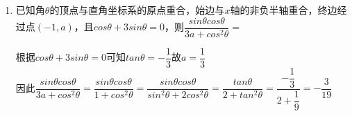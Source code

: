 \begin{enumerate}
         $ sin\alpha\cdot\sec\alpha>0$. 
        其中正确的是.
        \item 已知角$\theta$的顶点与直角坐标系的原点重合，始边与$x$轴的非负半轴重合，终边经过点$(-1, a)$，且$cos\theta + 3 sin\theta = 0$，则$\dfrac{sin\theta cos\theta}{3a+cos^2\theta}=$
        \begin{jieda}
            根据$cos\theta + 3 sin\theta = 0$可知$tan\theta = -\dfrac{1}{3}$故$a = \dfrac{1}{3}$ \\
            因此$\dfrac{sin\theta cos\theta}{3a+cos^2\theta} = \dfrac{sin\theta cos\theta}{1+cos^2\theta} = \dfrac{sin\theta cos\theta}{sin^2\theta + 2cos^2\theta} = \dfrac{tan\theta}{2 + tan^2\theta} = \dfrac{-\dfrac{1}{3}}{2 + \dfrac{1}{9}} = -\dfrac{3}{19}$
        \end{jieda}
        

\end{enumerate}
